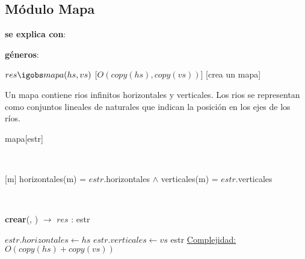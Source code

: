 \subsection{Módulo Mapa}

\begin{Interfaz}
  
  \textbf{se explica con}: 

  \textbf{géneros}: 


  {$res \igobs mapa(hs, vs)$}%
    [$O(copy(hs), copy(vs))$]
  [crea un mapa]

    \completar

\end{Interfaz}

\begin{Representacion}
  

  Un mapa contiene rios infinitos horizontales y verticales. Los rios se
  representan como conjuntos lineales de naturales que indican la posición en
  los ejes de los ríos.

  \begin{Estructura}{mapa}[estr]
    \begin{Tupla}[estr]
    \end{Tupla}

  \end{Estructura}
  

    ~ 

  [m]{
      horizontales(m) = $estr$.horizontales $\land$ 
      verticales(m) = $estr$.verticales
  }

\end{Representacion}

~

\begin{Algoritmos}

\begin{algorithm}[H]{\textbf{crear}(, ) $\to$ $res$ : estr}
\begin{algorithmic}[1]
    \State $estr.horizontales \gets hs$
    \State $estr.verticales \gets vs$
    \Return estr
    \medskip
    \Statex \underline{Complejidad:} $O(copy(hs) + copy(vs))$
\end{algorithmic}
\end{algorithm}

\completar
  
\end{Algoritmos}
